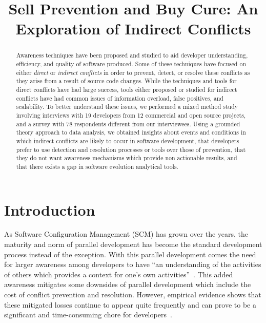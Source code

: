 \documentclass[conference]{IEEEtran}
\begin{document}
\title{Sell Prevention and Buy Cure: An Exploration of Indirect Conflicts}

\author{
}

\maketitle

\begin{abstract}

Awareness techniques have been proposed and studied to aid developer
understanding, efficiency, and quality of software produced. Some of these techniques have focused 
on either \textit{direct} or 
\textit{indirect conflicts} in order to prevent, detect, or resolve these conflicts as they arise
from a result of source code changes. While the techniques and tools for direct conflicts have had
large success, tools either proposed or studied for indirect conflicts have had common issues of
information overload, false positives, and scalability. To better understand these issues, 
we performed a mixed method study involving interviews with 19 developers from 12 commercial and open
source projects, and a survey with 78 respondents different from our interviewees. Using a grounded theory approach to data analysis, 
we obtained insights about events and conditions in which indirect conflicts are likely to occur in
software development, that developers prefer to use detection and resolution processes or tools
over those of prevention, that they do not want awareness mechanisms which provide non actionable results,
and that there exists a gap in software evolution analytical tools.

\end{abstract}

\section{Introduction}
\label{sec:intro}

As Software Configuration Management (SCM) has grown over the years, the maturity and norm of parallel 
development has become the standard development process instead of the exception. With this parallel development
comes the need for larger awareness among developers to have ``an understanding of the activities of others
which provides a context for one's own activities''~\cite{Dourish:1992:ACS}. This added awareness
mitigates some downsides of parallel development which include the cost of conflict prevention and resolution. However,
empirical evidence shows that these mitigated losses continue to appear quite frequently and can prove to be a significant
and time-consuming chore for developers~\cite{Perry:2001:PCL}.
\end{document}
